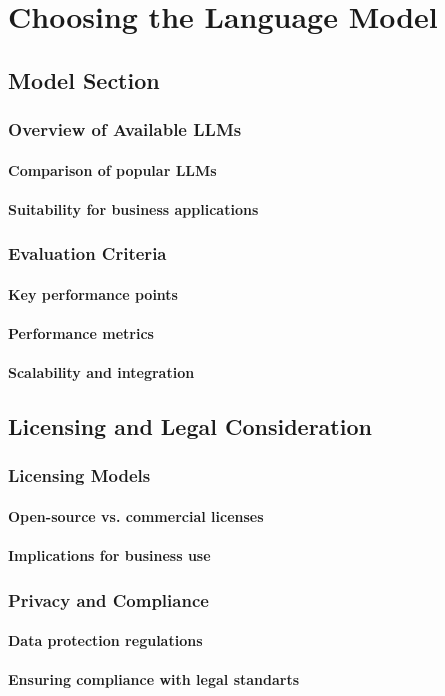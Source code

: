 \chapter{Choosing the Language Model}

\section{Model Section}

\subsection{Overview of Available LLMs}
\subsubsection{Comparison of popular LLMs}
\subsubsection{Suitability for business applications}

\subsection{Evaluation Criteria}
\subsubsection{Key performance points}
\subsubsection{Performance metrics}
\subsubsection{Scalability and integration}

\section{Licensing and Legal Consideration}
\subsection{Licensing Models}
\subsubsection{Open-source vs. commercial licenses}
\subsubsection{Implications for business use}

\subsection{Privacy and Compliance}
\subsubsection{Data protection regulations}
\subsubsection{Ensuring compliance with legal standarts}
